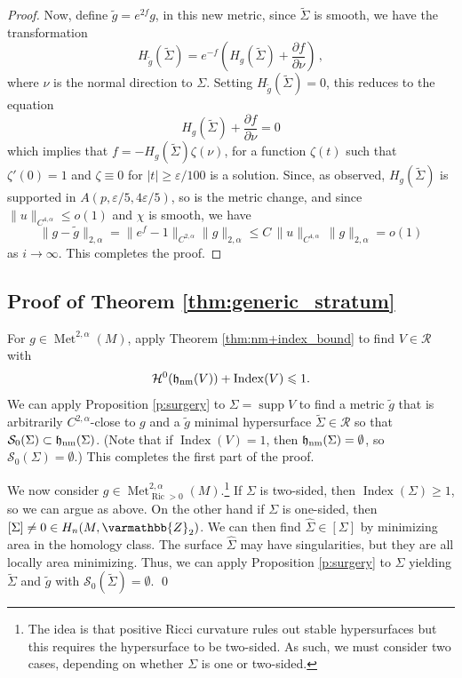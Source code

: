 \documentclass[12pt,twoside]{amsart}
\numberwithin{equation}{section}
\renewcommand{\leq}{\leqslant}
\renewcommand{\geq}{\geqslant}
\renewcommand{\mathbb}{\varmathbb}
\newcommand{\ZZ}{\mathbb{Z}}
\renewcommand{\cH}{\mathcal H}
\renewcommand{\cR}{\mathcal R}
\newcommand{\cS}{\mathcal S}
\DeclareMathOperator{\supp}{supp}
\DeclareMathOperator{\Ric}{Ric}
\newcommand{\eps}{\varepsilon}
\DeclareMathOperator{\Index}{Index}
\DeclareMathOperator{\Met}{Met}
\DeclareMathOperator{\hnm}{\mathfrak{h}_\textnormal{nm}}
\begin{document}
\begin{proof}
	Now, define $\tilde g = e^{2f} g$, in this new metric, since $\tilde \Sigma$ is smooth, we have the transformation
	$$
	H_{\tilde g}(\tilde \Sigma)= e^{-f}\left(H_g(\tilde\Sigma)+\frac{\partial f}{\partial \nu} \right)\,,
	$$
	where $\nu$ is the normal direction to $\Sigma$. 
	Setting $H_{\tilde g}(\tilde \Sigma)=0$, this reduces to the equation
	$$
	H_g(\tilde\Sigma)+\frac{\partial f}{\partial \nu}=0
	$$
	which implies that $f=-H_g(\tilde \Sigma) \zeta(\nu)$, for a function $\zeta(t)$ such that $\zeta'(0)=1$ and $\zeta\equiv0$ for $|t|\geq \eps/100$ is a solution. Since, as observed, $H_g(\tilde\Sigma)$ is supported in $A(p,\eps/5,4\eps/5)$, so is the metric change, and since $\|u\|_{C^{4,\alpha}}\leq o(1)$ and $\chi$ is smooth, we have
	$$
	\|g-\tilde g\|_{2,\alpha}=\|e^f-1\|_{C^{2,\alpha}} \|g\|_{2,\alpha} \leq C\, \|u\|_{C^{4,\alpha}}\,   \|g\|_{2,\alpha} = o(1)
	$$ 
	as $i\to \infty$. This completes the proof. 
\end{proof}
	
	\subsection{Proof of Theorem \ref{thm:generic_stratum}} For $g \in \Met^{2,\alpha}(M)$, apply Theorem \ref{thm:nm+index_bound} to find $V\in\cR$ with
	\[
	\cH^0(\hnm(V)) + \Index(V) \leq 1.
	\]
	We can apply Proposition \ref{p:surgery} to $\Sigma = \supp V$ to find a metric $\tilde g$ that is arbitrarily $C^{2,\alpha}$-close to $g$ and a $\tilde g$ minimal hypersurface $\tilde\Sigma \in \cR$ so that $\cS_0(\Sigma) \subset \hnm(\Sigma)$. (Note that if $\Index(V) = 1$, then $ \hnm(\Sigma) =\emptyset$, so $\cS_0(\Sigma) = \emptyset$.) This completes the first part of the proof. 
	
We now consider $g \in \Met^{2,\alpha}_{\Ric>0}(M)$.\footnote{The idea is that positive Ricci curvature rules out stable hypersurfaces but this requires the hypersurface to be two-sided. As such, we must consider two cases, depending on whether $\Sigma$ is one or two-sided.} If $\Sigma$ is two-sided, then $\Index(\Sigma)\geq1$, so we can argue as above.  On the other hand if $\Sigma$ is one-sided, then $[\Sigma]\neq 0 \in H_{n}(M,\ZZ_{2})$. We can then find $\hat\Sigma \in [\Sigma]$ by minimizing area in the homology class. The surface $\hat\Sigma$ may have singularities, but they are all locally area minimizing. Thus, we can apply Proposition \ref{p:surgery} to $\Sigma$ yielding $\tilde\Sigma$ and $\tilde g$ with $\cS_0(\tilde\Sigma) = \emptyset$. 
\qed








\end{document}
